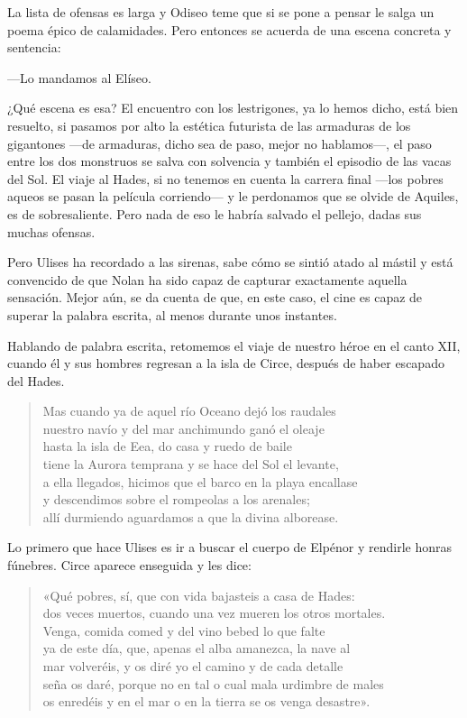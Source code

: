 La lista de ofensas es larga y Odiseo teme que si se pone a pensar le salga un poema épico de calamidades. Pero entonces se acuerda de una escena concreta y sentencia:

---Lo mandamos al Elíseo.

¿Qué escena es esa? El encuentro con los lestrigones, ya lo hemos dicho, está bien resuelto, si pasamos por alto la estética futurista de las armaduras de los gigantones ---de armaduras, dicho sea de paso, mejor no hablamos---, el paso entre los dos monstruos se salva con solvencia y también el episodio de las vacas del Sol. El viaje al Hades, si no tenemos en cuenta la carrera final ---los pobres aqueos se pasan la película corriendo--- y le perdonamos que se olvide de Aquiles, es de sobresaliente. Pero nada de eso le habría salvado el pellejo, dadas sus muchas ofensas.

Pero Ulises ha recordado a las sirenas, sabe cómo se sintió atado al mástil y está convencido de que Nolan ha sido capaz de capturar exactamente aquella sensación. Mejor aún, se da cuenta de que, en este caso, el cine es capaz de superar la palabra escrita, al menos durante unos instantes.

Hablando de palabra escrita, retomemos el viaje de nuestro héroe en el canto XII, cuando él y sus hombres regresan a la isla de Circe, después de haber escapado del Hades.

\begin{verse}
Mas cuando ya de aquel río Oceano dejó los raudales\\
nuestro navío y del mar anchimundo ganó el oleaje\\
hasta la isla de Eea, do casa y ruedo de baile\\
tiene la Aurora temprana y se hace del Sol el levante,\\
a ella llegados, hicimos que el barco en la playa encallase\\
y descendimos sobre el rompeolas a los arenales;\\
allí durmiendo aguardamos a que la divina alborease.
\end{verse}

Lo primero que hace Ulises es ir a buscar el cuerpo de Elpénor y rendirle honras fúnebres. Circe aparece enseguida y les dice:

\begin{verse}
«Qué pobres, sí, que con vida bajasteis a casa de Hades:\\
dos veces muertos, cuando una vez mueren los otros mortales.\\
Venga, comida comed y del vino bebed lo que falte\\
ya de este día, que, apenas el alba amanezca, la nave al\\
mar volveréis, y os diré yo el camino y de cada detalle\\
seña os daré, porque no en tal o cual mala urdimbre de males\\
os enredéis y en el mar o en la tierra se os venga desastre».
\end{verse}

